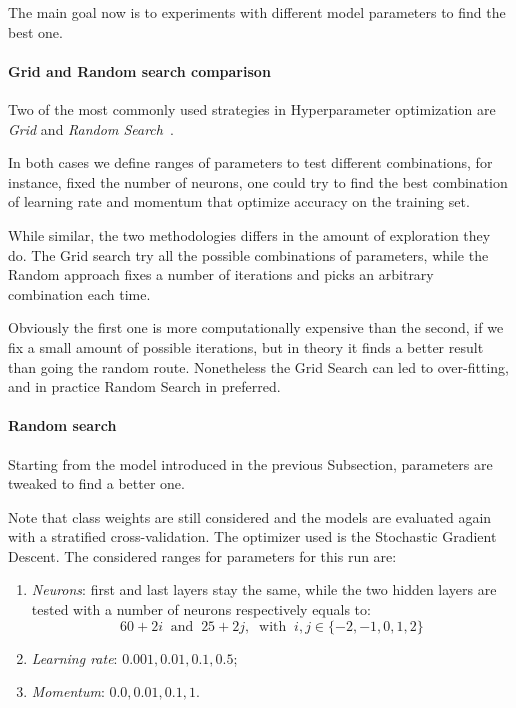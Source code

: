 The main goal now is to experiments with different model parameters 
to find the best one.

\paragraph{Grid and Random search comparison}
Two of the most commonly used strategies in Hyperparameter optimization
are \emph{Grid} and \emph{Random Search}~\cite{random-grid}. 

In both cases we define ranges of parameters to test different combinations, 
for instance, fixed the number of neurons, one could try to find the best 
combination of learning rate and momentum that optimize accuracy on the training set.

While similar, the two methodologies differs in the amount of exploration they do.
The Grid search try all the possible combinations of parameters, while the 
Random approach fixes a number of iterations and picks an arbitrary combination each time. 

Obviously the first one is more computationally expensive than the second, if 
we fix a small amount of possible iterations, but in theory it finds a better result
than going the random route. 
Nonetheless the Grid Search can led to over-fitting, and in practice Random 
Search in preferred.

\paragraph{Random search}
Starting from the model introduced in the previous Subsection, parameters are 
tweaked to find a better one.

Note that class weights are still considered and the models are evaluated
again with a stratified cross-validation.
The optimizer used is the Stochastic Gradient Descent.
The considered ranges for parameters for this run are: 
\begin{enumerate}
    \item \emph{Neurons}: first and last layers stay the same, while 
    the two hidden layers are tested with a number of neurons respectively 
    equals to: 
    $$60 + 2i\;\;\text{and}\;\;25 + 2j,\;\;\text{with}\;\; i, j \in \{-2,-1,0,1,2\}$$
    \item \emph{Learning rate}: $0.001, 0.01, 0.1, 0.5$;
    \item \emph{Momentum}: $0.0, 0.01, 0.1, 1$.
\end{enumerate}

